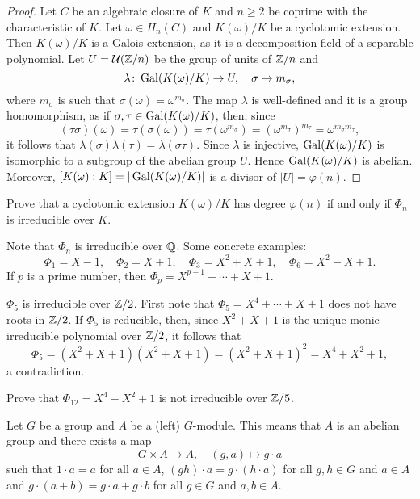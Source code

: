\begin{proof}
    Let $C$ be an algebraic closure of $K$ and $n\geq2$ be coprime with the characteristic of $K$. 
    Let $\omega\in H_n(C)$ and $K(\omega)/K$ be a cyclotomic extension. Then $K(\omega)/K$
    is a Galois extension, as it is a decomposition field of a separable polynomial. 
    Let $U=\mathcal{U}(\mathbb{Z}/n)$ be the group of units of $\mathbb{Z}/n$ and 
    \[
    \lambda\colon \operatorname{Gal}(K(\omega)/K)\to U,
    \quad
    \sigma\mapsto m_{\sigma},
    \]
    where $m_{\sigma}$ is such that $\sigma(\omega)=\omega^{m_{\sigma}}$. The map $\lambda$ is well-defined and
    it is a group homomorphism, as if $\sigma,\tau\in\operatorname{Gal}(K(\omega)/K)$, then, since 
    \[
        (\tau\sigma)(\omega)=\tau(\sigma(\omega))=\tau(\omega^{m_\sigma})=\left(\omega^{m_\sigma}\right)^{m_\tau}=\omega^{m_\sigma m_\tau},
    \]
    it follows that $\lambda(\sigma)\lambda(\tau)=\lambda(\sigma\tau)$. Since 
    $\lambda$ is injective, $\operatorname{Gal}(K(\omega)/K)$ is isomorphic to a subgroup 
    of the abelian group $U$. Hence $\operatorname{Gal}(K(\omega)/K)$ is abelian. Moreover, 
    $[K(\omega):K]=|\operatorname{Gal}(K(\omega)/K)|$ is a divisor of $|U|=\varphi(n)$. 
\end{proof}

\begin{exercise}
    Prove that a cyclotomic extension $K(\omega)/K$ has degree $\varphi(n)$ if and only if 
    $\Phi_n$ is irreducible over $K$. 
\end{exercise}

Note that $\Phi_n$ is irreducible over $\mathbb{Q}$. Some concrete examples:
\[
\Phi_1=X-1,
\quad
\Phi_2=X+1,
\quad
\Phi_3=X^2+X+1,
\quad
\Phi_6=X^2-X+1.
\]
If $p$ is a prime number, then $\Phi_p=X^{p-1}+\cdots+X+1$. 

\begin{example}
    $\Phi_5$ is irreducible over $\mathbb{Z}/2$. First note that
    $\Phi_5=X^{4}+\cdots+X+1$ does not have roots in $\mathbb{Z}/2$. If 
    $\Phi_5$ is reducible, then, since
    $X^2+X+1$ is the unique monic irreducible polynomial 
    over $\mathbb{Z}/2$, it follows that
    \[
    \Phi_5=(X^2+X+1)(X^2+X+1)=(X^2+X+1)^2=X^4+X^2+1,
    \]
    a contradiction.
\end{example}

\begin{exercise}
Prove that
$\Phi_{12}=X^4-X^2+1$ is not irreducible over $\mathbb{Z}/5$. 
\end{exercise}


Let $G$ be a group and $A$ be a (left) $G$-module. This means that $A$ is an abelian
group and there exists a map
\[
G\times A\to A,\quad
(g,a)\mapsto g\cdot a
\]
such that $1\cdot a=a$ for all $a\in A$, $(gh)\cdot a=g\cdot (h\cdot a)$ for 
all $g,h\in G$ and $a\in A$ and $g\cdot (a+b)=g\cdot a+g\cdot b$ for
all $g\in G$ and $a,b\in A$. 

